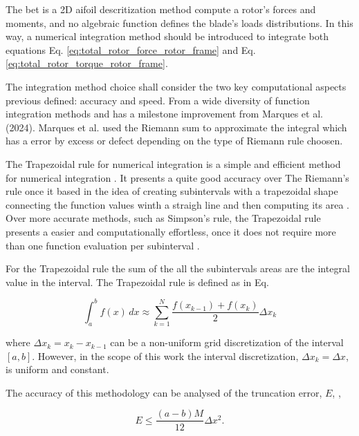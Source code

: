 The \gls{bet} is a 2D aifoil descritization method compute a rotor's forces and moments, and no algebraic function defines the blade's loads distributions. In this way, a numerical integration method should be introduced to integrate both equations Eq. \ref{eq:total_rotor_force_rotor_frame} and Eq. \ref{eq:total_rotor_torque_rotor_frame}. 

The integration method choice shall consider the two key computational aspects previous defined: accuracy and speed. From a wide diversity of function integration methods and has a milestone improvement from Marques et al. \cite{marques_design_2024} (2024). Marques et al. \cite{marques_design_2024} used the Riemann sum to approximate the integral which has a error by excess or defect depending on the type of Riemann rule choosen. 

The Trapezoidal rule for numerical integration is a simple and efficient method for numerical integration \cite{press_numerical_2007}. It presents a quite good accuracy over The Riemann's rule once it based in the idea of creating subintervals with a trapezoidal shape connecting the function values winth a straigh line and then computing its area \cite{lindfield_numerical_2019}. Over more accurate methods, such as Simpson's rule, the Trapezoidal rule presents a easier and computationally effortless, once it does not require more than one function evaluation per subinterval \cite{arnold_numerical_2011, press_numerical_2007, lindfield_numerical_2019}. 

For the Trapezoidal rule the sum of the all the subintervals areas are the integral value in the interval. The Trapezoidal rule is defined as in Eq. 

\begin{equation}
    \int_{a}^{b}f(x)\,d x\approx\sum_{k=1}^{N}{\frac{f(x_{k-1})+f(x_{k})}{2}}\Delta x_{k}
\end{equation}

\noindent where $\Delta x_{k}=x_{k}-x_{k-1}$ can be a non-uniform grid discretization of the interval $\left[a, b \right]$. However, in the scope of this work the interval discretization, $\Delta x_{k} = \Delta x$, is uniform and constant.

The accuracy of this methodology can be analysed of the truncation error, $E$, \cite{lindfield_numerical_2019},

\begin{equation}
    E \le \frac{(a-b) M}{12} \Delta x^{2}.
    \label{eq:trap_trunc_error}
\end{equation}

